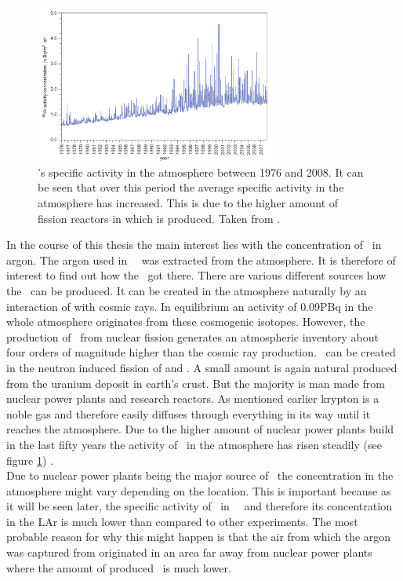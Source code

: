 \documentclass[encoding=utf8,british]{tumphthesis}
\begin{document}
\begin{figure}[t!]
	\centering
	\ifmakefigures%
	\includegraphics[width=80mm]{./Bilder/Kr85Aenderung.png}
	\fi%
	\caption{
	    \Kr's specific activity in the atmosphere between 1976 and 2008. It can be seen that over this period the average specific activity in the atmosphere has increased. This is due to the higher amount of fission reactors in which \Kr is produced.   
		Taken from \cite{bieringer_trace_2009}.
	}
    \label{fig:Kr85Aenderung}
\end{figure}


In the course of this thesis the main interest lies with the concentration of \Kr\ in argon.
The argon used in \gerda\ \PII\ was extracted from the atmosphere.
It is therefore of interest to find out how the \Kr\ got there.
There are various different sources how the \Kr\ can be produced.
It can be created in the atmosphere naturally by an interaction of  with cosmic rays.
In equilibrium an activity of 0.09PBq in the whole atmosphere originates from these cosmogenic isotopes.
However, the production of \Kr\ from nuclear fission generates an atmospheric inventory about four orders of magnitude higher than the cosmic ray production.
\Kr\ can be created in the neutron induced fission of  and .
A small amount is again natural produced from the uranium deposit in earth's crust.
But the majority is man made from nuclear power plants and research reactors.
As mentioned earlier krypton is a noble gas and therefore easily diffuses through everything in its way until it reaches the atmosphere.
Due to the higher amount of nuclear power plants build in the last fifty years the activity of \Kr\ in the atmosphere has risen steadily (see figure \ref{fig:Kr85Aenderung}) \cite{bieringer_trace_2009}.
\\

Due to nuclear power plants being the major source of \Kr\, the concentration in the atmosphere might vary depending on the location.
This is important because as it will be seen later, the specific activity of \Kr\ in \gerda\ \PII\ and therefore its concentration in the LAr is much lower than compared to other experiments.
The most probable reason for why this might happen is that the air from which the argon was captured from originated in an area far away from nuclear power plants where the amount of produced \Kr\ is much lower.
\\
\end{document}
